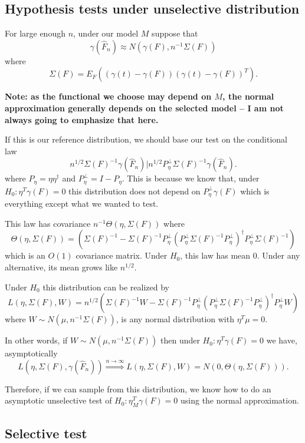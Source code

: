 \documentclass{article}
\begin{document}
\subsection{Hypothesis tests under unselective distribution}


For large enough $n$, under our model $M$ suppose that
$$
\gamma(\hat{F}_n) \approx N(\gamma(F), n^{-1} \Sigma(F))
$$
where
$$
\Sigma(F) = E_{F}\left((\gamma(t) - \gamma(F))(\gamma(t) - \gamma(F))^T \right).
$$

{\bf Note: as the functional
we choose may depend on $M$, the normal approximation generally depends 
on the selected model -- I am not always going to emphasize that here.}

If this is our reference distribution, we should base our test on the 
conditional law 
$$n^{1/2}\Sigma(F)^{-1}\gamma(\hat{F}_n) \big \vert n^{1/2} P_{\eta}^{\perp}\Sigma(F)^{-1}\gamma(\hat{F}_n).$$ 
where $P_{\eta}=\eta\eta^{\dagger}$ and $P_{\eta}^{\perp} = I - P_{\eta}$.
This is because
we know that, under $H_0:\eta^T\gamma(F)=0$
this distribution does not depend on $P_{\eta}^{\perp}\gamma(F)$ which
is everything except what we wanted to test. 
 
This 
law has covariance $n^{-1} \Theta(\eta, \Sigma(F))$ where
$$
\Theta(\eta, \Sigma(F)) = \left(\Sigma(F)^{-1} - \Sigma(F)^{-1} P_{\eta}^{\perp} \left(P_{\eta}^{\perp} \Sigma(F)^{-1} P_{\eta}^{\perp} \right)^{\dagger}  P_{\eta}^{\perp} \Sigma(F)^{-1}  \right)
$$
which is an $O(1)$ covariance matrix.
Under $H_0$, this law has mean 0. Under any alternative, its mean grows like $n^{1/2}$.

Under $H_0$
this distribution can be realized by 
$$
L(\eta, \Sigma(F), W) = n^{1/2} \left(\Sigma(F)^{-1} W - \Sigma(F)^{-1} P_{\eta}^{\perp} \left(P_{\eta}^{\perp} 
\Sigma(F)^{-1} P_{\eta}^{\perp} \right)^{\dagger}  P_{\eta}^{\perp} W \right)
$$
where $W \sim N(\mu, n^{-1}\Sigma(F))$, is any normal distribution with
$\eta^T\mu=0$.

In other words, if $W \sim N(\mu, n^{-1}\Sigma(F))$ 
then under $H_0: \eta^T\gamma(F)=0$ we have, asymptotically
$$
 L(\eta, \Sigma(F), \gamma(\hat{F}_n))  \overset{n \rightarrow \infty}{\Rightarrow} L(\eta, \Sigma(F), W) = N(0,  \Theta(\eta, \Sigma(F))).
$$


Therefore, if we can
sample from this distribution, we know how to
do an asymptotic unselective test of $H_0:\eta_M^T\gamma(F)=0$ using the 
normal approximation.


\subsection{Selective test}
\label{sec:selective}
\end{document}
